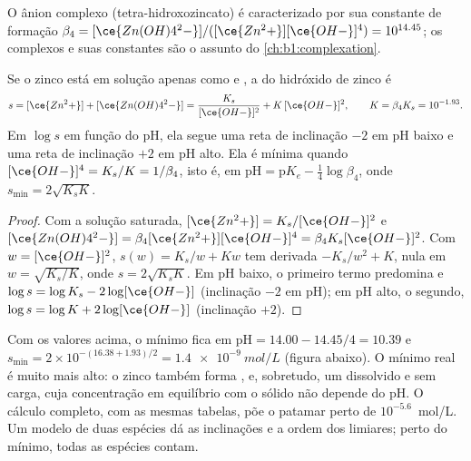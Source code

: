 O ânion complexo  (tetra-hidroxozincato) é caracterizado
por sua constante de formação $\beta_4 = [\ce{Zn(OH)4^2-}]/([\ce{Zn^2+}][\ce{OH-}]^4)
= 10^{14.45}$; os complexos e suas constantes são o assunto do
\cref{ch:b1:complexation}.

\begin{proposition}\label{prop:b1:precipitation:amphoteric}
Se o zinco está em solução apenas como  e , a
 do hidróxido de zinco é
\[
  s = [\ce{Zn^2+}] + [\ce{Zn(OH)4^2-}] = \frac{K_s}{[\ce{OH-}]^2} + K\,[\ce{OH-}]^2,
  \qquad K = \beta_4 K_s = 10^{-1.93} .
\]
Em $\log s$ em função do pH, ela segue uma reta de inclinação $-2$ em pH
baixo e uma reta de inclinação $+2$ em pH alto. Ela é mínima quando
$[\ce{OH-}]^4 = K_s/K = 1/\beta_4$, isto é, em $\mathrm{pH} =
\mathrm{p}K_e - \frac14\log\beta_4$, onde $s_{\min} = 2\sqrt{K_s K}$.
\end{proposition}

\begin{proof}
Com a solução saturada, $[\ce{Zn^2+}] = K_s/[\ce{OH-}]^2$ e
$[\ce{Zn(OH)4^2-}] = \beta_4[\ce{Zn^2+}][\ce{OH-}]^4 = \beta_4 K_s
[\ce{OH-}]^2$. Com $w = [\ce{OH-}]^2$, $s(w) = K_s/w + Kw$ tem derivada
$-K_s/w^2 + K$, nula em $w = \sqrt{K_s/K}$, onde $s = 2\sqrt{K_s K}$. Em
pH baixo, o primeiro termo predomina e $\log s = \log K_s - 2\log[\ce{OH-}]$
(inclinação $-2$ em pH); em pH alto, o segundo, $\log s = \log K + 2\log[\ce{OH-}]$
(inclinação $+2$).
\end{proof}

Com os valores acima, o mínimo fica em $\mathrm{pH} = 14.00 - 14.45/4
= 10.39$ e $s_{\min} = 2 \times 10^{-(16.38 + 1.93)/2} =
\qty{1.4e-9}{mol/L}$
(figura abaixo). O mínimo real é muito mais alto: o zinco também forma
,  e, sobretudo, um  dissolvido e
sem carga, cuja concentração em equilíbrio com o sólido não depende do
pH. O cálculo completo, com as mesmas tabelas, põe o patamar perto de
$10^{-5.6}$~mol/L. Um modelo de duas espécies dá as inclinações e a
ordem dos limiares; perto do mínimo, todas as espécies contam.

